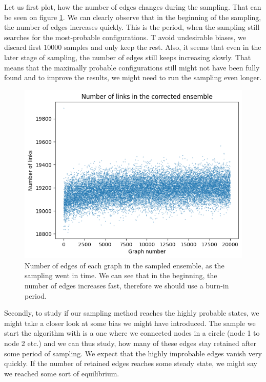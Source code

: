 Let us first plot, how the number of edges changes during the sampling. That can be seen on figure \ref*{fig:num_links_MH}. We can clearly observe that in the beginning of the sampling, the number of edges increases quickly. This is the period, when the sampling still searches for the most-probable configurations. T avoid undesirable biases, we discard first $10\mathpunct{}000$ samples and only keep the rest. Also, it seems that even in the later stage of sampling, the number of edges still keeps increasing slowly. That means that the maximally probable configurations still might not have been fully found and to improve the results, we might need to run the sampling even longer. 

\begin{figure}[!ht]
    \centering
    \includegraphics[scale=0.8]{../img/metropolis/num_links.png}
    \caption{Number of edges of each graph in the sampled ensemble, as the sampling went in time. We can see that in the beginning, the number of edges increases fast, therefore we should use a burn-in period.}
    \label{fig:num_links_MH}
\end{figure}

Secondly, to study if our sampling method reaches the highly probable states, we might take a closer look at some bias we might have introduced. The sample we start the algorithm with is a one where we connected nodes in a circle (node 1 to node 2 etc.) and we can thus study, how many of these edges stay retained after some period of sampling. We expect that the highly improbable edges vanish very quickly. If the number of retained edges reaches some steady state, we might say we reached some sort of equilibrium. 

